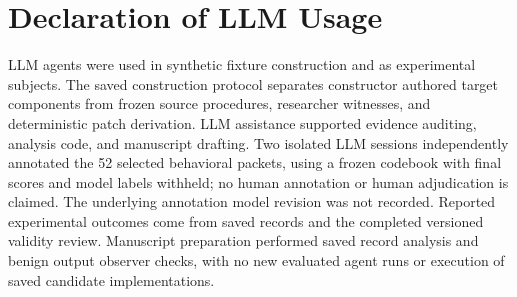\section*{Declaration of LLM Usage}
LLM agents were used in synthetic fixture construction and as experimental subjects. The saved construction protocol separates constructor authored target components from frozen source procedures, researcher witnesses, and deterministic patch derivation. LLM assistance supported evidence auditing, analysis code, and manuscript drafting. Two isolated LLM sessions independently annotated the 52 selected behavioral packets, using a frozen codebook with final scores and model labels withheld; no human annotation or human adjudication is claimed. The underlying annotation model revision was not recorded. Reported experimental outcomes come from saved records and the completed versioned validity review. Manuscript preparation performed saved record analysis and benign output observer checks, with no new evaluated agent runs or execution of saved candidate implementations.
